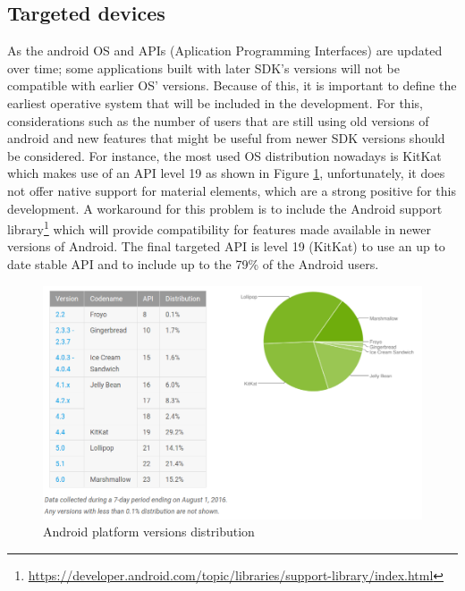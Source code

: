 \subsection{Targeted devices}
As the android OS and APIs (Aplication Programming Interfaces) are updated over time; some applications built with later SDK's versions will not be compatible with earlier OS' versions. Because of this, it is important to define the earliest operative system that will be included in the development. For this, considerations such as the number of users that are still using old versions of android and new features that might be useful from newer SDK versions should be considered. For instance, the most used OS distribution nowadays is KitKat which makes use of an API level 19 as shown in Figure \ref{fig:android_platform_versions}, unfortunately, it does not offer native support for material elements, which are a strong positive for this development. A workaround for this problem is to include the Android support library\footnote{\url{https://developer.android.com/topic/libraries/support-library/index.html}} which will provide compatibility for features made available in newer versions of Android. The final targeted API is level 19 (KitKat) to use an up to date stable API and to include up to the 79\% of the Android users.  

\begin{figure}[H]
\begin{adjustbox}{width=1\textwidth,center=\textwidth}
  \centering
  \includegraphics[scale=1]{images/android_platform_versions.png}
\end{adjustbox}
  \caption[Android platform versions distribution]{Android platform versions distribution \footnotemark}
  \label{fig:android_platform_versions}
\end{figure}

